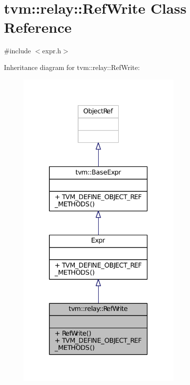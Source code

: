 \hypertarget{classtvm_1_1relay_1_1RefWrite}{}\section{tvm\+:\+:relay\+:\+:Ref\+Write Class Reference}
\label{classtvm_1_1relay_1_1RefWrite}


{\ttfamily \#include $<$expr.\+h$>$}



Inheritance diagram for tvm\+:\+:relay\+:\+:Ref\+Write\+:
\nopagebreak
\begin{figure}[H]
\begin{center}
\leavevmode
\includegraphics[width=230pt]{classtvm_1_1relay_1_1RefWrite__inherit__graph}
\end{center}
\end{figure}


